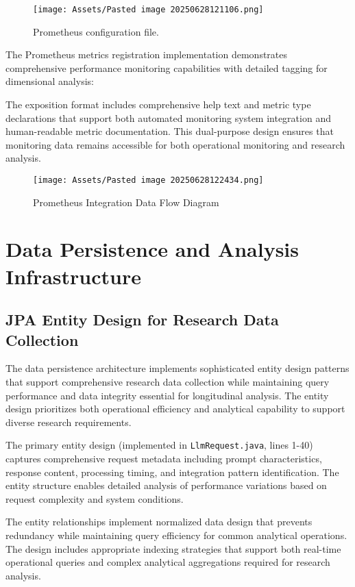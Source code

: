 \begin{figure}[H]
    \centering
    \texttt{[image: Assets/Pasted image 20250628121106.png]}
    \caption{Prometheus configuration file.\cite{Prometheus}}
\end{figure}

The Prometheus metrics registration implementation demonstrates comprehensive performance monitoring capabilities with detailed tagging for dimensional analysis:



The exposition format includes comprehensive help text and metric type declarations that support both automated monitoring system integration and human-readable metric documentation. This dual-purpose design ensures that monitoring data remains accessible for both operational monitoring and research analysis.

\begin{figure}[H]
    \centering
    \texttt{[image: Assets/Pasted image 20250628122434.png]}
    \caption{Prometheus Integration Data Flow Diagram}
\end{figure}


\section{Data Persistence and Analysis Infrastructure}

\subsection{JPA Entity Design for Research Data Collection}

The data persistence architecture implements sophisticated entity design patterns that support comprehensive research data collection while maintaining query performance and data integrity essential for longitudinal analysis. The entity design prioritizes both operational efficiency and analytical capability to support diverse research requirements.

The primary entity design (implemented in \texttt{LlmRequest.java}, lines 1-40) captures comprehensive request metadata including prompt characteristics, response content, processing timing, and integration pattern identification. The entity structure enables detailed analysis of performance variations based on request complexity and system conditions.


The entity relationships implement normalized data design that prevents redundancy while maintaining query efficiency for common analytical operations. The design includes appropriate indexing strategies that support both real-time operational queries and complex analytical aggregations required for research analysis.

